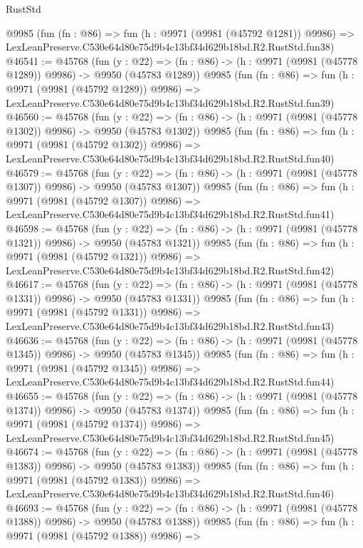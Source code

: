 \begin{lexlean}{RustStd}
\begin{coremodule}
    @9985
    (fun (fn : @86) =>
    fun (h : @9971 (@9981 (@45792 @1281)) @9986) =>
    LexLeanPreserve.C530e64d80e75d9b4c13bf34d629b18bd.R2.RustStd.fun38)
@46541 := @45768
    (fun (y : @22) =>
    (fn : @86) -> (h : @9971 (@9981 (@45778 @1289)) @9986) -> @9950 (@45783 @1289))
    @9985
    (fun (fn : @86) =>
    fun (h : @9971 (@9981 (@45792 @1289)) @9986) =>
    LexLeanPreserve.C530e64d80e75d9b4c13bf34d629b18bd.R2.RustStd.fun39)
@46560 := @45768
    (fun (y : @22) =>
    (fn : @86) -> (h : @9971 (@9981 (@45778 @1302)) @9986) -> @9950 (@45783 @1302))
    @9985
    (fun (fn : @86) =>
    fun (h : @9971 (@9981 (@45792 @1302)) @9986) =>
    LexLeanPreserve.C530e64d80e75d9b4c13bf34d629b18bd.R2.RustStd.fun40)
@46579 := @45768
    (fun (y : @22) =>
    (fn : @86) -> (h : @9971 (@9981 (@45778 @1307)) @9986) -> @9950 (@45783 @1307))
    @9985
    (fun (fn : @86) =>
    fun (h : @9971 (@9981 (@45792 @1307)) @9986) =>
    LexLeanPreserve.C530e64d80e75d9b4c13bf34d629b18bd.R2.RustStd.fun41)
@46598 := @45768
    (fun (y : @22) =>
    (fn : @86) -> (h : @9971 (@9981 (@45778 @1321)) @9986) -> @9950 (@45783 @1321))
    @9985
    (fun (fn : @86) =>
    fun (h : @9971 (@9981 (@45792 @1321)) @9986) =>
    LexLeanPreserve.C530e64d80e75d9b4c13bf34d629b18bd.R2.RustStd.fun42)
@46617 := @45768
    (fun (y : @22) =>
    (fn : @86) -> (h : @9971 (@9981 (@45778 @1331)) @9986) -> @9950 (@45783 @1331))
    @9985
    (fun (fn : @86) =>
    fun (h : @9971 (@9981 (@45792 @1331)) @9986) =>
    LexLeanPreserve.C530e64d80e75d9b4c13bf34d629b18bd.R2.RustStd.fun43)
@46636 := @45768
    (fun (y : @22) =>
    (fn : @86) -> (h : @9971 (@9981 (@45778 @1345)) @9986) -> @9950 (@45783 @1345))
    @9985
    (fun (fn : @86) =>
    fun (h : @9971 (@9981 (@45792 @1345)) @9986) =>
    LexLeanPreserve.C530e64d80e75d9b4c13bf34d629b18bd.R2.RustStd.fun44)
@46655 := @45768
    (fun (y : @22) =>
    (fn : @86) -> (h : @9971 (@9981 (@45778 @1374)) @9986) -> @9950 (@45783 @1374))
    @9985
    (fun (fn : @86) =>
    fun (h : @9971 (@9981 (@45792 @1374)) @9986) =>
    LexLeanPreserve.C530e64d80e75d9b4c13bf34d629b18bd.R2.RustStd.fun45)
@46674 := @45768
    (fun (y : @22) =>
    (fn : @86) -> (h : @9971 (@9981 (@45778 @1383)) @9986) -> @9950 (@45783 @1383))
    @9985
    (fun (fn : @86) =>
    fun (h : @9971 (@9981 (@45792 @1383)) @9986) =>
    LexLeanPreserve.C530e64d80e75d9b4c13bf34d629b18bd.R2.RustStd.fun46)
@46693 := @45768
    (fun (y : @22) =>
    (fn : @86) -> (h : @9971 (@9981 (@45778 @1388)) @9986) -> @9950 (@45783 @1388))
    @9985
    (fun (fn : @86) =>
    fun (h : @9971 (@9981 (@45792 @1388)) @9986) =>

\end{coremodule}
\end{lexlean}
